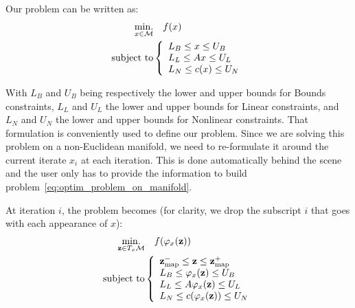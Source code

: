 Our problem can be written as:
\begin{align}
\label{eq:optim_problem_on_manifold}
  \operatorname*{min.}_{x \in \mathcal{M}} & \quad f(x)\\ \nonumber
  \text{subject to}&\left\{
  \begin{array}{lr}
    L_B \leq x \leq U_B \\
    L_L \leq Ax \leq U_L \\
    L_N \leq c(x) \leq U_N
  \end{array}\right.
\end{align}

With $L_B$ and $U_B$ being respectively the lower and upper bounds for Bounds constraints, $L_L$ and $U_L$ the lower and upper bounds for Linear constraints, and $L_N$ and $U_N$ the lower and upper bounds for Nonlinear constraints.
That formulation is conveniently used to define our problem.
Since we are solving this problem on a non-Euclidean manifold, we need to re-formulate it around the current iterate $x_i$ at each iteration.
This is done automatically behind the scene and the user only has to provide the information to build problem~\ref{eq:optim_problem_on_manifold}.

At iteration $i$, the problem becomes (for clarity, we drop the subscript $i$ that goes with each appearance of $x$):
\begin{align}
\label{eq:optim_problem_on_txm}
  \operatorname*{min.}_{\mathbf{z} \in T_x\mathcal{M}} & \quad f(\varphi_x(\mathbf{z}))\\ \nonumber
  \text{subject to}&\left\{
  \begin{array}{lr}
    {\bf z}_{\text{map}}^- \leq \mathbf{z} \leq {\bf z}_{\text{map}}^+ \\
    L_B \leq \varphi_x(\mathbf{z}) \leq U_B \\
    L_L \leq A\varphi_x(\mathbf{z}) \leq U_L \\
    L_N \leq c(\varphi_x(\mathbf{z})) \leq U_N
  \end{array}\right.
\end{align}

